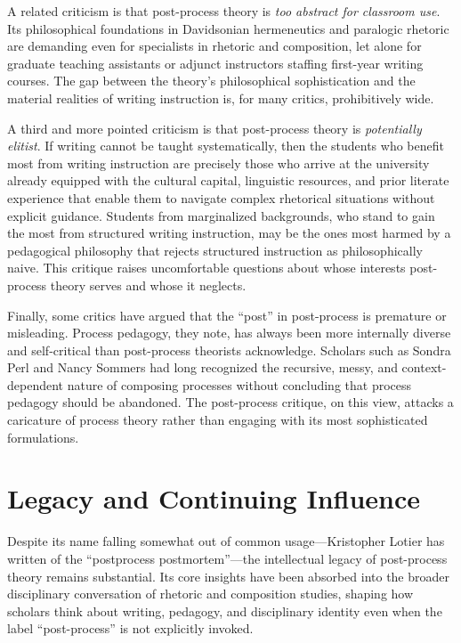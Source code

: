 \documentclass[12pt]{article}
\begin{document}
A related criticism is that post-process theory is \textit{too abstract for classroom use}. Its philosophical foundations in Davidsonian hermeneutics and paralogic rhetoric are demanding even for specialists in rhetoric and composition, let alone for graduate teaching assistants or adjunct instructors staffing first-year writing courses. The gap between the theory's philosophical sophistication and the material realities of writing instruction is, for many critics, prohibitively wide.

A third and more pointed criticism is that post-process theory is \textit{potentially elitist}. If writing cannot be taught systematically, then the students who benefit most from writing instruction are precisely those who arrive at the university already equipped with the cultural capital, linguistic resources, and prior literate experience that enable them to navigate complex rhetorical situations without explicit guidance. Students from marginalized backgrounds, who stand to gain the most from structured writing instruction, may be the ones most harmed by a pedagogical philosophy that rejects structured instruction as philosophically naive. This critique raises uncomfortable questions about whose interests post-process theory serves and whose it neglects.

Finally, some critics have argued that the ``post'' in post-process is premature or misleading. Process pedagogy, they note, has always been more internally diverse and self-critical than post-process theorists acknowledge. Scholars such as Sondra Perl and Nancy Sommers had long recognized the recursive, messy, and context-dependent nature of composing processes without concluding that process pedagogy should be abandoned. The post-process critique, on this view, attacks a caricature of process theory rather than engaging with its most sophisticated formulations.

\section{Legacy and Continuing Influence}

Despite its name falling somewhat out of common usage---Kristopher Lotier has written of the ``postprocess postmortem''---the intellectual legacy of post-process theory remains substantial. Its core insights have been absorbed into the broader disciplinary conversation of rhetoric and composition studies, shaping how scholars think about writing, pedagogy, and disciplinary identity even when the label ``post-process'' is not explicitly invoked.
\end{document}
